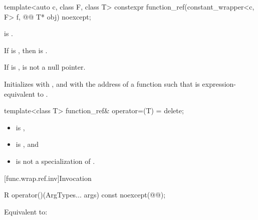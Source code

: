 %
\begin{itemdecl}
template<auto c, class F, class T>
  constexpr function_ref(constant_wrapper<c, F> f, @\cv{}@ T* obj) noexcept;
\end{itemdecl}

\begin{itemdescr}
\pnum
\constraints
{} is .

\pnum
\mandates
If  is , then  is .

\pnum
\expects
If  is ,  is not a null pointer.

\pnum
\effects
Initializes  with , and  with the address of a function  such that  is expression-equivalent to .
\end{itemdescr}

%
\begin{itemdecl}
template<class T> function_ref& operator=(T) = delete;
\end{itemdecl}

\begin{itemdescr}
\pnum
\constraints
\begin{itemize}
\item {} is ,
\item {} is , and
\item {} is not a specialization of .
\end{itemize}
\end{itemdescr}

[func.wrap.ref.inv]{Invocation}

%
\begin{itemdecl}
R operator()(ArgTypes... args) const noexcept(@@);
\end{itemdecl}

\begin{itemdescr}
\pnum
\effects
Equivalent to: 
\end{itemdescr}

